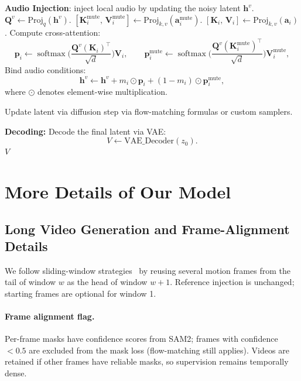 \documentclass{article} %
\begin{document}
\begin{algorithm}[ht]
\begin{algorithmic}[1]
                \State \textbf{Audio Injection}: inject local audio by updating the noisy latent $\mathbf{h}^{v}$.
                \State $\mathbf{Q}^{v} \gets \text{Proj}_q(\mathbf{h}^{v})$. \quad $[\mathbf{K}^{\text{mute}}_i,\, \mathbf{V}^{\text{mute}}_i] \gets \text{Proj}_{k,v}(\mathbf{a}_i^{\text{mute}})$. \quad $[\mathbf{K}_i,\, \mathbf{V}_i] \gets \text{Proj}_{k,v}(\mathbf{a}_i)$.
                \State Compute cross-attention:
                \[
                \mathbf{p}_i \gets \operatorname{softmax}\Big(\frac{\mathbf{Q}^{v} (\mathbf{K}_i)^{\top}}{\sqrt{d}}\Big)\mathbf{V}_i,  \quad \quad \mathbf{p}^{\text{mute}}_i \gets \operatorname{softmax}\Big(\frac{\mathbf{Q}^{v} (\mathbf{K}^{\text{mute}}_i)^{\top}}{\sqrt{d}}\Big)\mathbf{V}^{\text{mute}}_i, 
                \]
                \State Bind audio conditions:
                \[
                \mathbf{h}^{v} \gets \mathbf{h}^{v} + m_i \odot \mathbf{p}_i + (1-m_i) \odot \mathbf{p}_i^{\text{mute}},
                \]
                where $\odot$ denotes element-wise multiplication.
            \EndFor
        \EndIf
        
        \State Update latent via diffusion step via flow-matching formulas or custom samplers.
    \EndFor
    
    \State \textbf{Decoding:} Decode the final latent via VAE:
    \[
    V \gets \text{VAE\_Decoder}(z_0).
    \]
    \Return $V$
\end{algorithmic}
\end{algorithm}

\section{More Details of Our Model}



\subsection{Long Video Generation and Frame-Alignment Details}
We follow sliding-window strategies~\citep{jiang2024loopy,emo} by reusing several motion frames from the tail of window $w$ as the head of window $w\!+\!1$. Reference injection is unchanged; starting frames are optional for window 1.

\paragraph{Frame alignment flag.}
Per-frame masks have confidence scores from SAM2; frames with confidence $<0.5$ are excluded from the mask loss (flow-matching still applies). Videos are retained if other frames have reliable masks, so supervision remains temporally dense.
\end{document}
